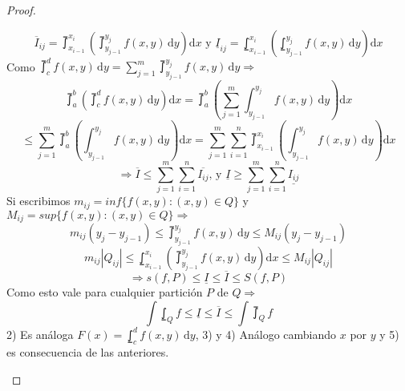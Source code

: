 \begin{theorem}
\begin{proof}
\begin{enumerate}
\begin{equation}
        \overline{I}_{ij} = \upint_{x_{i-1}}^{x_i}( \upint_{y_{j-1}}^{y_j}f(x, y)\,\mathrm{d}y)\mathrm{d}x \text{ y }
        \underline{I}_{ij} = \lowint_{x_{i-1}}^{x_i}( \lowint_{y_{j-1}}^{y_j}f(x, y)\,\mathrm{d}y)\mathrm{d}x
      \end{equation} Como $\upint_c^d f(x, y)\, \mathrm{d}y = \sum_{j = 1}^m \upint_{y_{j-1}}^{y_j} f(x, y)\, \mathrm{d}y \Rightarrow$ \begin{equation}
        \upint_a^b(\upint_c^d f(x, y)\, \mathrm{d}y)\mathrm{d}x = \upint_a^b( \sum_{j = 1}^m \int_{y_{j-1}}^{y_j}f(x, y)\, \mathrm{d}y)\mathrm{d}x
      \end{equation}
      \begin{equation}
        \leq \sum_{j = 1}^m \upint_a^b(\int_{y_{j-1}}^{y_j}f(x, y)\, \mathrm{d}y)\mathrm{d}x = \sum_{j = 1}^m \sum_{i = 1}^n \upint_{x_{i-1}}^{x_i}(\int_{y_{j-1}}^{y_j}f(x,y)\,\mathrm{d}y)\mathrm{d}x
      \end{equation}
      \begin{equation}
        \Rightarrow \overline{I} \leq \sum_{j = 1}^m \sum_{i = 1}^n \overline{I_{ij}} \text{, y } \underline{I} \geq \sum_{j = 1}^m \sum_{i = 1}^n \underline{I_{ij}}
      \end{equation}
      Si escribimos $m_{ij} = inf\{ f(x, y) : (x, y) \in Q \}$ y $M_{ij} = sup\{ f(x, y) : (x, y) \in Q\} \Rightarrow$ \begin{equation}
        m_{ij} (y_j - y_{j-1}) \leq \upint_{y_{j-1}}^{y_j} f(x, y)\, \mathrm{d} y \leq M_{ij} (y_j - y_{j-1})
      \end{equation}
      \begin{equation}
        m_{ij} |Q_{ij}| \leq \lowint_{x_{i-1}}^{x_i} ( \upint_{y_{j-1}}^{y_j} f(x, y)\, \mathrm{d}y )\mathrm{d}x \leq M_{ij} |Q_{ij}|
      \end{equation}
      \begin{equation}
        \Rightarrow s(f, P) \leq \underline{I} \leq \overline{I} \leq S(f, P)
      \end{equation} Como esto vale para cualquier partición $P$ de $Q \Rightarrow$ \begin{equation}
        \int\lowint_Q f \leq \underline{I} \leq \overline{I} \leq \int\upint_Q f
      \end{equation}
      2) Es análoga $F(x) = \lowint_c^d f(x, y) \, \mathrm{d}y$, 3) y 4) Análogo cambiando $x$ por $y$ y 5) es consecuencia de las anteriores.
    \end{enumerate}
  \end{proof}
\end{theorem}

